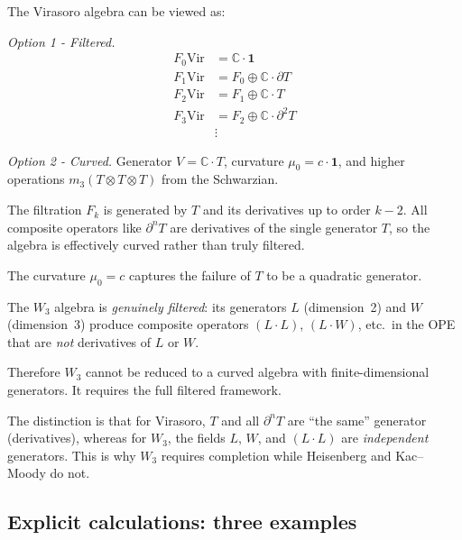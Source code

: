 \begin{example}\label{ex:vir-filtered-to-curved}
The Virasoro algebra can be viewed as:

\emph{Option 1 - Filtered.}
\begin{align}
F_0\text{Vir} &= \mathbb{C} \cdot \mathbf{1} \\
F_1\text{Vir} &= F_0 \oplus \mathbb{C} \cdot \partial T \\
F_2\text{Vir} &= F_1 \oplus \mathbb{C} \cdot T \\
F_3\text{Vir} &= F_2 \oplus \mathbb{C} \cdot \partial^2 T \\
&\vdots
\end{align}

\emph{Option 2 - Curved.} Generator $V = \mathbb{C} \cdot T$, curvature $\mu_0 = c \cdot \mathbf{1}$, and higher operations $m_3(T \otimes T \otimes T)$ from the Schwarzian.

The filtration $F_k$ is generated by $T$ and its derivatives up to order $k-2$. All composite
operators like $\partial^n T$ are derivatives of the single generator $T$, so the algebra is
effectively curved rather than truly filtered.

The curvature $\mu_0 = c$ captures the failure of $T$ to be a quadratic generator.
\end{example}

\begin{example}\label{ex:w3-not-curved}
The $W_3$ algebra is \emph{genuinely filtered}: its generators $L$ (dimension~2) and $W$ (dimension~3) produce composite operators $(L \cdot L)$, $(L \cdot W)$, etc.\ in the OPE that are \emph{not} derivatives of $L$ or $W$.

Therefore $W_3$ cannot be reduced to a curved algebra with finite-dimensional generators. 
It requires the full filtered framework.

The distinction is that for Virasoro, $T$ and all $\partial^n T$ are ``the same'' generator (derivatives),
whereas for $W_3$, the fields $L$, $W$, and $(L \cdot L)$ are \emph{independent} generators.
This is why $W_3$ requires completion while Heisenberg and Kac--Moody do not.
\end{example}

\subsection{Explicit calculations: three examples}

